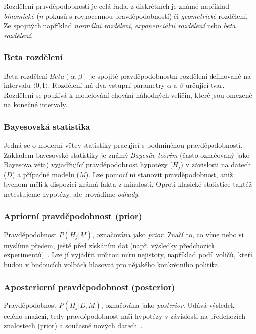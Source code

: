 \documentclass[thesis=M,czech]{FITthesis}[2014/05/07]
\begin{document}
Rozdělení pravděpodobnosti je celá řada, z diskrétních je známé například \emph{binomické} ($n$ pokusů s rovnocennou pravděpodobností) či \emph{geometrické} rozdělení. Ze spojitých například \emph{normální rozdělení}, \emph{exponenciální rozdělení} nebo \emph{beta rozdělení}.

\subsubsection{Beta rozdělení}
\label{beta}
Beta rozdělení ${Beta}(\alpha, \beta)$ je spojité pravděpodobnostní rozdělení definované na intervalu $\langle0,1\rangle$. Rozdělení má dva vstupní parametry $\alpha$ a $\beta$ určující tvar. Rozdělení se používá k modelování chování náhodných veličin, které jsou omezené na konečné intervaly. 

\subsubsection{Bayesovská statistika}
Jedná se o moderní větev statistiky pracující s podmíněnou pravděpodobností. Základem bayesovské statistiky je známý \emph{Bayesův teorém} (často označovaný jako Bayesova věta) vyjadřující pravděpodobnost hypotézy ($H_j$) v závislosti na datech ($D$) a případně modelu ($M$). Lze pomocí ni stanovit pravděpodobnost, aniž bychom měli k dispozici známá fakta z minulosti. Oproti klasické statistice taktéž netestujeme hypotézy, ale provádíme \emph{odhady}. 

\subsubsection{Apriorní pravděpodobnost (prior)}
\label{prior}
Pravděpodobnost $P(H_j | M)$, označována jako \emph{prior}. Značí to, co víme nebo si myslíme předem, ještě před získáním dat (např. výsledky předchozích experimentů)~\cite{pst4}. Lze jí vyjádřit určitou míru nejistoty, například podíl voličů, kteří budou v budoucích volbách hlasovat pro nějakého konkrétního politika. 

\subsubsection{Aposteriorní pravděpodobnost (posterior)}
\label{poster}
Pravděpodobnost $P(H_j | D, M)$, označována jako \emph{posterior}. Udává výsledek celého snažení, tedy pravděpodobnost naší hypotézy v závislosti na předchozích znalostech (prior) a současně nových datech~\cite{pst4}.
\end{document}
